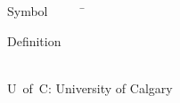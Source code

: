 \def\CTeXPreproc{Created by ctex v0.2.14, don't edit!}%


\begin{tabbing}
Symbol~~~~~\= \ \ \ \ \ \ \ \ \ \ \ \ \ \ \ \ \ \ \ \ \ \ \ \ \ \ \ \ \ \ \ \ \ \ \ \  \parbox{5in}{Definition}\\

\addsymbol \mbox{U of C}: {University of Calgary}

\end{tabbing}

